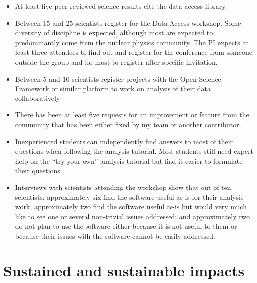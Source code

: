 \begin{itemize}
  \item At least five peer-reviewed science results cite the data-access library.
  \item Between 15 and 25 scientists register for the Data Access workshop.  Some diversity of discipline is expected, although most are expected to predominantly come from the nuclear physics community.  The PI expects at least three attendees to find out and register for the conference from someone outside the group and for most to register after specific invitation.
  \item Between 5 and 10 scientists register projects with the Open Science Framework or similar platform to work on analysis of their data collaboratively
  \item There has been at least five requests for an improvement or feature from the community that has been either fixed by my team or another contributor.
  \item Inexperienced students can independently find answers to most of their questions when following the analysis tutorial.  Most students still need expert help on the ``try your own'' analysis tutorial but find it easier to formulate their questions
  \item Interviews with scientists attending the workshop show that out of ten scientists: approximately six find the software useful as-is for their analysis work; approximately two find the software useful as-is but would very much like to see one or several non-trivial issues addressed; and approximately two do not plan to use the software either because it is not useful to them or because their issues with the software cannot be easily addressed.
\end{itemize}


\section{Sustained and sustainable impacts}

